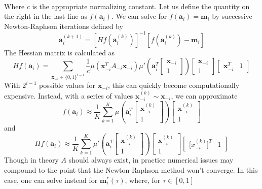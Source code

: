 \documentclass[11pt]{article}
\theoremstyle{definition}
\begin{document}
\begin{enumerate}
\begin{align*}
            \end{align*}
            Where $c$ is the appropriate normalizing constant. Let us define the quantity on the right in the last line as $f(\mathbf a_i)$. We can solve for $f(\mathbf a_i)=\mathbf{m}_i$ by successive Newton-Raphson iterations defined by 
            \[\mathbf a_i^{(k+1)} = \left[H f\left(\mathbf a_i^{(k)}\right)\right]^{-1}\left[f\left(\mathbf a_i^{(k)}\right)-\mathbf m_i\right] \]
            The Hessian matrix is calculated as 
        \[ H f\left(\mathbf a_i\right) = \sum_{\mathbf x_{-i} \in \{0,1\}^{i-1}} \frac{1}{c}\mu \left(\mathbf x_{-i}^TA_{-i}\mathbf x_{-i}\right) \mu'\left(\mathbf{a}_i^T\left[\begin{array}{c} \mathbf x_{-i} \\ 1 \end{array}\right]\right)\left[\begin{array}{c} \mathbf x_{-i} \\ 1 \end{array}\right]\left[\begin{array}{cc} \mathbf x_{-i}^T & 1 \end{array}\right] \]
            With $2^{i-1}$ possible values for $\mathbf x_{-i}$, this can quickly become computationally expensive. Instead, with a series of values $\mathbf x_{-i}^{(k)}\sim \mathbf x_{-i}$, we can approximate
            \[f\left(\mathbf a_i\right) \approx \frac{1}{K}\sum_{k=1}^K \mu\left(\mathbf{a}_i^T\left[\begin{array}{c} \mathbf x_{-i}^{(k)} \\ 1 \end{array}\right]\right)\left[\begin{array}{c} \mathbf x_{-i}^{(k)} \\ 1 \end{array}\right] \]
            and
            \[H f\left(\mathbf a_i\right) \approx \frac{1}{K}\sum_{k=1}^K \mu'\left(\mathbf{a}_i^T\left[\begin{array}{c} \mathbf x_{-i}^{(k)} \\ 1 \end{array}\right]\right)\left[\begin{array}{c} \mathbf x_{-i}^{(k)} \\ 1 \end{array}\right]\left[\begin{array}{cc} \mathbf [x_{-i}^{(k)}]^T & 1 \end{array}\right] \]
            Though in theory $A$ should always exist, in practice numerical issues may compound to the point that the Newton-Raphson method won't converge. In this case, one can solve instead for $\mathbf m_i^*(\tau)$, where, for $\tau\in[0,1]$

\end{enumerate}
\end{document}
